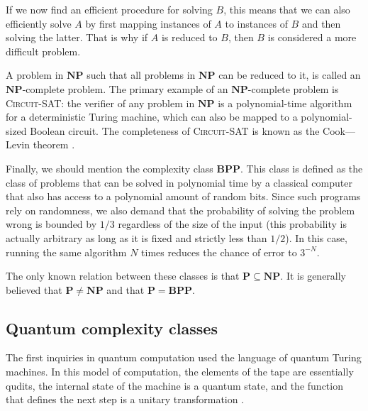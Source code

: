 If we now find an efficient procedure for solving $B$, this means that we can also efficiently solve $A$ by first mapping instances of $A$ to instances of $B$ and then solving the latter. That is why if $A$ is reduced to $B$, then $B$ is considered a more difficult problem.

A problem in $\mathbf{NP}$ such that all problems in $\mathbf{NP}$ can be reduced to it, is called an $\mathbf{NP}$-complete problem. The primary example of an $\mathbf{NP}$-complete problem is \textsc{Circuit-SAT}: the verifier of any problem in $\mathbf{NP}$ is a polynomial-time algorithm for a deterministic Turing machine, which can also be mapped to a polynomial-sized Boolean circuit. The completeness of \textsc{Circuit-SAT} is known as the Cook---Levin theorem \cite{cook_complexity_1971,levin_universal_1973}.

Finally, we should mention the complexity class $\mathbf{BPP}$. This class is defined as the class of problems that can be solved in polynomial time by a classical computer that also has access to a polynomial amount of random bits. Since such programs rely on randomness, we also demand that the probability of solving the problem wrong is bounded by $1/3$ regardless of the size of the input (this probability is actually arbitrary as long as it is fixed and strictly less than $1/2$). In this case, running the same algorithm $N$ times reduces the chance of error to $3^{-N}$.

The only known relation between these classes is that $\mathbf{P} \subseteq \mathbf{NP}$. It is generally believed that $\mathbf{P} \neq \mathbf{NP}$ and that $\mathbf{P} = \mathbf{BPP}$.

\subsection{Quantum complexity classes}

The first inquiries in quantum computation used the language of quantum Turing machines. In this model of computation, the elements of the tape are essentially qudits, the internal state of the machine is a quantum state, and the function that defines the next step is a unitary transformation \cite{bernstein_quantum_1997}.


